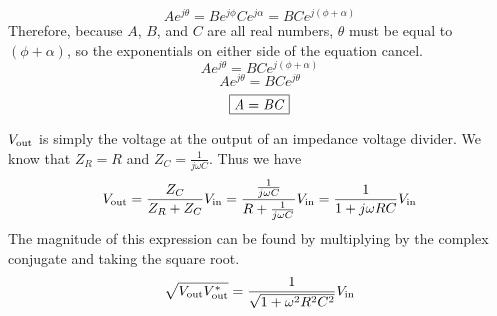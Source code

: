 \[ A e^{j\theta} = B e^{j\phi}C e^{j\alpha} = BC e^{j\left(\phi + \alpha\right)}\]
Therefore, because $A$, $B$, and $C$ are all real numbers, $\theta$ must be equal to $(\phi + \alpha)$, so the exponentials on either side of the equation cancel.
\[A e^{j\theta} =  BC e^{j\left(\phi + \alpha\right)}\]
\[A e^{j\theta} = BC e^{j\theta}\]
\[\boxed{\textnormal{\textit{A}} = \textnormal{\textit{BC}}}\]




$V_{\text{out}}$ is simply the voltage at the output of an impedance voltage divider. We know that $Z_R = R$ and $Z_C = \frac{1}{j\omega C}$. Thus we have 
\[V_{\text{out}} = \frac{Z_C}{Z_R + Z_C} V_{\text{in}} = \frac{\frac{1}{j \omega C}}{R + \frac{1}{j \omega C}} V_{\text{in}} = \frac{1}{1 + j \omega R C} V_{\text{in}}\]
The magnitude of this expression can be found by multiplying by the complex conjugate and taking the square root.
\[\sqrt{V_{\text{out}} V_{\text{out}}^*} = \frac{1}{\sqrt{1 + \omega^2R^2C^2}}V_{\text{in}}\]














